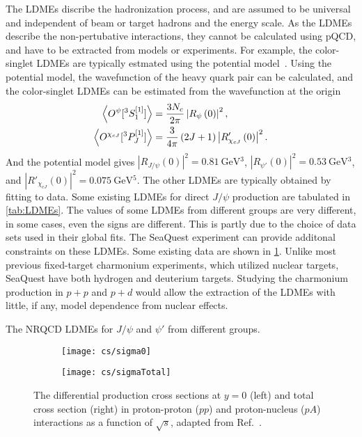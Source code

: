 \documentclass[../main.tex]{subfiles}
\begin{document}
The LDMEs discribe the hadronization process,
and are assumed to be universal and independent of beam or target hadrons and the energy scale.
As the LDMEs describe the non-pertubative interactions,
they cannot be calculated using pQCD, and have to be extracted from models or experiments.
For example, the color-singlet LDMEs are typically estmated using the potential model~\cite{eichten1995}.
Using the potential model, the wavefunction of the heavy quark pair can be calculated, 
and the color-singlet LDMEs can be estimated from the wavefunction at the origin
\begin{equation}
	\begin{split}
		\expval{O^{\psi}[^3S_1^{\left[1\right]}]} &= \frac{3N_c}{2\pi} \left| R_{\psi}\left(0\right)\right|^2,\\
		\expval{O^{\chi_{cJ}}[^3P_J^{\left[1\right]}]} &= \frac{3}{4\pi}\left(2J+1\right) \left| R'_{\chi_{cJ}}\left(0\right)\right|^2.
	\end{split}
\end{equation}
And the potential model gives $\left|R_{J/\psi}\left(0\right)\right|^2=\SI{0.81}{\GeV^3}$,
$\left|R_{\psi'}\left(0\right)\right|^2=\SI{0.53}{\GeV^3}$, and $\left|R'_{\chi_{cJ}}\left(0\right)\right|^2=\SI{0.075}{\GeV^5}$.
The other LDMEs are typically obtained by fitting to data.
Some existing LDMEs for direct $J/\psi$ production are tabulated in \cref{tab:LDMEs}.
The values of some LDMEs from different groups are very different, in some cases, even the signs are different.
This is partly due to the choice of data sets used in their global fits. The
SeaQuest experiment can provide additonal constraints on these LDMEs. Some
existing data are shown in \cref{fig:charm_cs}.
Unlike most previous fixed-target charmonium experiments, which utilized nuclear
targets, SeaQuest have both hydrogen and deuterium targets.
Studying the charmonium production in $p+p$ and $p+d$ would allow the extraction
of the LDMEs with little, if any, model dependence from nuclear effects.

\begin{table}[ht!]
	\centering
	\caption{The NRQCD LDMEs for $J/\psi$ and $\psi'$ from different groups.}
	\label{tab:LDMEs}
	\scalebox{0.81}{
		
	}
\end{table}

\begin{figure}[ht!]
	\centering
	\begin{subfigure}{0.48\linewidth}
		\texttt{[image: cs/sigma0]}
	\end{subfigure}
	\begin{subfigure}{0.48\linewidth}
		\texttt{[image: cs/sigmaTotal]}
	\end{subfigure}
	\caption{The differential production cross sections at $y=0$ (left) and total
		cross section (right) in proton-proton ($pp$) and proton-nucleus ($pA$) interactions
		as a function of $\sqrt{s}$, adapted from Ref.~\cite{maltoni2006}.}
	\label{fig:charm_cs}
\end{figure}
\end{document}
